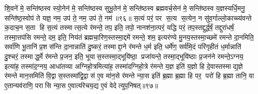 शि॒वने॑ मे॒ सन्ति॑ष्ठस्व स्यो॒नेन॑  मे॒ सन्ति॑ष्ठस्व सुभू॒तेन॑  मे॒ सन्ति॑ष्ठस्व ब्रह्मवर्च॒सेन॑  मे॒ सन्ति॑ष्ठस्व य॒ज्ञस्यर्धि॒मनु॒ सन्ति॑ष्ठ॒स्वोप॑ ते यज्ञ॒ नम॒ उप॑ ते॒ नम॒ उप॑ ते॒ नम॑॥९६॥ 
\anuvakamend
{}
स॒त्यं परं॒ पर स॒त्य स॒त्येन॒ न सु॑व॒र्गाल्लो॒काच्च्य॑वन्ते क॒दाच॒न स॒ता हि स॒त्यं तस्मात्स॒त्ये र॑मन्ते॒ तप॒ इति॒ तपो॒ नानश॑ना॒त्परं॒ यद्धि परं॒ तप॒स्तद्दुर्द्ध॑र्\mbox{}षं॒ तद्दुरा॑धर्\mbox{}षं॒ तस्मा॒त्तप॑सि रमन्ते॒ दम॒ इति॒ निय॑तं ब्रह्मचा॒रिण॒स्तस्मा॒द्दमे॑ रमन्ते॒ शम॒ इत्यर॑ण्ये मु॒नय॒स्तस्मा॒च्छमे॑ रमन्ते दा॒नमिति॒ सर्वा॑णि भू॒तानि॑ प्र॒शस॑न्ति दा॒नान्नाति॑ दु॒ष्करं॒ तस्माद्दा॒ने र॑मन्ते ध॒र्म इति॒ धर्मे॑ण॒ सर्व॑मि॒दं परि॑गृहीतं ध॒र्मान्नाति॑ दु॒श्चरं॒ तस्माद्ध॒र्मे र॑मन्ते प्र॒जन॒ इति॒ भूयास॒स्तस्मा॒द्भूयि॑ष्ठा॒ प्रजा॑यन्ते॒ तस्मा॒द्भूयि॑ष्ठाः प्र॒जन॑ने रमन्ते॒ऽग्नय॒ इत्या॑ह॒ तस्मा॑द॒ग्नय॒ आधा॑तव्या अग्निहो॒त्रमित्या॑ह॒ तस्मा॑दग्निहो॒त्रे र॑मन्ते य॒ज्ञ इति॑ य॒ज्ञो हि दे॒वास्तस्माद्य॒ज्ञे र॑मन्ते मान॒समिति॑ वि॒द्वास॒स्तस्मा॑द्वि॒द्वास॑ ए॒व मा॑न॒से र॑मन्ते न्या॒स इति॑ ब्र॒ह्मा ब्र॒ह्मा हि पर॒ परो॑ हि ब्र॒ह्मा तानि॒ वा ए॒तान्यव॑राणि॒ परासि न्या॒स ए॒वात्य॑रेचय॒द्य ए॒वं वेदेत्युप॒निषत्॥९७॥
\anuvakamend


